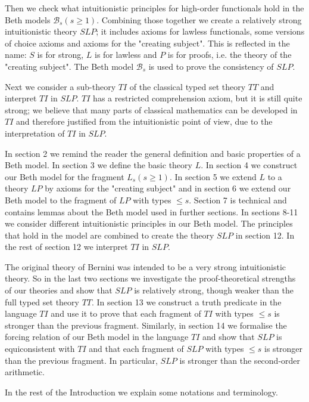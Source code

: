 \documentclass{asl}
\theoremstyle{definition}
\begin{document}
Then we check what intuitionistic principles for high-order functionals hold in the Beth models $\mathcal{B}_s (s\geqslant 1)$. Combining those together we create a relatively strong intuitionistic theory $SLP$; it includes axioms for lawless functionals, some versions of choice axioms and axioms for the "creating subject". This is reflected in the name: $S$ is for strong, $L$ is for lawless and $P$ is for proofs, i.e. the theory of the "creating subject". The Beth model $\mathcal{B}_s$  is used to prove the consistency of $SLP$. 

Next we consider a sub-theory $TI$ of the classical typed set theory $TT$ and interpret $TI$ in $SLP$. $TI$ has a restricted comprehension axiom, but it is still quite strong; we believe that many parts of classical mathematics can be developed in $TI$ and therefore justified from the intuitionistic point of view, due to the interpretation of $TI$ in $SLP$.   

In section 2 we remind the reader the general definition and basic properties of a Beth model. In section 3 we define the basic theory $L$. In section 4 we construct our Beth model for the fragment $L_s (s\geqslant 1)$. In section 5 we extend $L$ to a theory $LP$ by axioms for the "creating subject" and in section 6 we extend our Beth model to the fragment of $LP$ with types $\leqslant s$. Section 7 is technical and contains lemmas about the Beth model used in further sections. In sections 8-11 we consider different intuitionistic principles in our Beth model. The principles that hold in the model are combined to create the theory $SLP$ in section 12. In the rest of section 12 we interpret $TI$ in $SLP$. 

The original theory of Bernini \cite{bern76} was intended to be a very strong intuitionistic theory. So in the last two sections we investigate the proof-theoretical strengths of our theories and show that $SLP$ is relatively strong, though weaker than the full typed set theory $TT$. In section 13 we construct a truth predicate in the language $TI$ and use it to prove that each fragment of $TI$ with types $\leqslant s$ is stronger than the previous fragment. Similarly, in section 14 we formalise the forcing relation of our Beth model in the language $TI$ and show that $SLP$ is equiconsistent with $TI$ and that each fragment of $SLP$ with types $\leqslant s$ is stronger than the previous fragment. In particular, $SLP$ is stronger than the second-order arithmetic.

In the rest of the Introduction we explain some notations and terminology. 
\end{document}
